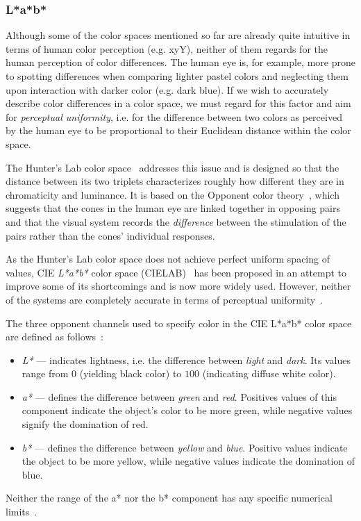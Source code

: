 \subsubsection{L*a*b*}

Although some of the color spaces mentioned so far are already quite intuitive in terms of human color perception (e.g. xyY), neither of them regards for the human perception of color differences. The human eye is, for example, more prone to spotting differences when comparing lighter pastel colors and neglecting them upon interaction with darker color (e.g. dark blue). If we wish to accurately describe color differences in a color space, we must regard for this factor and aim for \emph{perceptual uniformity}, i.e. for the difference between two colors as perceived by the human eye to be proportional to their Euclidean distance within the color space.

The Hunter's Lab color space~\cite{hunterLabCIELabComparison} addresses this issue and is designed so that the distance between its two triplets characterizes roughly how different they are in chromaticity and luminance. It is based on the Opponent color theory~\cite{opponentColorTheory}, which suggests that the cones in the human eye are linked together in opposing pairs and that the visual system records the \emph{difference} between the stimulation of the pairs rather than the cones' individual responses.

As the Hunter's Lab color space does not achieve perfect uniform spacing of values, CIE \emph{L*a*b*} color space (CIELAB)~\cite{labColorScale} has been proposed in an attempt to improve some of its shortcomings and is now more widely used. However, neither of the systems are completely accurate in terms of perceptual uniformity~\cite{hunterLabCIELabComparison}.

The three opponent channels used to specify color in the CIE L*a*b* color space are defined as follows~\cite{labColorScale}:
\begin{itemize}
	\item \emph{L*} --- indicates lightness, i.e. the difference between \emph{light} and \emph{dark}. Its values range from $0$ (yielding black color) to $100$ (indicating diffuse white color).
	\item \emph{a*} --- defines the difference between \emph{green} and \emph{red}. Positives values of this component indicate the object's color to be more green, while negative values signify the domination of red.
	\item \emph{b*} --- defines the difference between \emph{yellow} and \emph{blue}. Positive values indicate the object to be more yellow, while negative values indicate the domination of blue.
\end{itemize}
Neither the range of the a* nor the b* component has any specific numerical limits~\cite{labColorScale}.

